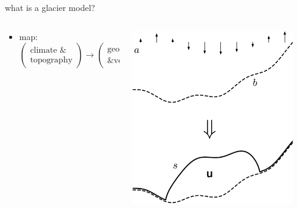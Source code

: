 \documentclass[svgnames,
               hyperref={colorlinks,citecolor=DeepPink4,linkcolor=FireBrick,urlcolor=Maroon},
               usepdftitle=false]  %
               {beamer}
\begin{document}
\begin{frame}{what is a glacier model?}
\begin{columns}
\begin{column}{0.6\textwidth}
\begin{itemize}
\smallskip
\item {\small \alert{map}: \, $\begin{pmatrix} \text{climate \&} \\ \text{topography} \end{pmatrix} \to \begin{pmatrix} \text{geometry} \\ \text{\& velocity} \end{pmatrix}$ }
\end{itemize}
\end{column}
\begin{column}{0.42\textwidth}
\hfill \includegraphics[width=0.9\textwidth]{../images/map-velocity.png}

\vspace{2mm}
\end{column}
\end{columns}
\end{frame}
\end{document}
